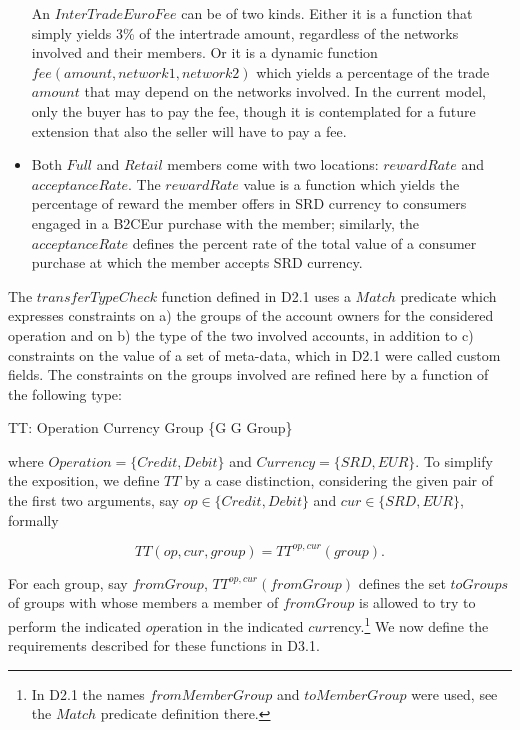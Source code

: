 \begin{itemize}
An $InterTradeEuroFee$ can be of two kinds. Either it is a function that simply yields 3\% of the intertrade amount, regardless of the networks involved and their members. Or it is a dynamic function $fee(amount,network1,network2)$ which yields a percentage of the trade $amount$ that may depend on the networks involved. In the current model, only the buyer has to pay the fee, though it is contemplated for a future extension that also the seller will have to pay a fee.

\item Both $Full$ and $Retail$ members come with two locations: $rewardRate$ and $acceptanceRate$. The $rewardRate$ value is a function which yields the percentage of reward the member offers in SRD currency to consumers engaged in a B2CEur purchase with the member; similarly, the $acceptanceRate$ defines the percent rate of the total value of a consumer purchase at which the member accepts SRD currency.

\end{itemize}

The $transferTypeCheck$ function defined in D2.1 uses a $Match$ predicate which expresses constraints on a) the groups of the account owners for the considered operation and on b) the type of the two involved accounts, in addition to c) constraints on the value of a set of meta-data, which in D2.1 were called custom fields. The constraints on the groups involved are refined here by a function of the following type:
\begin{asm}
TT: Operation \times Currency \times Group \rightarrow \{G \mid G \subseteq Group\}
\end{asm} 
\noindent where $Operation = \{Credit,Debit\}$ and $Currency =\{SRD,EUR\}$.
To simplify the exposition, we define $TT$ by a case distinction, considering the given pair of the first two arguments, say  $op \in \{Credit,Debit\}$ and $cur \in \{SRD,EUR\}$, formally

\[TT(op,cur,group)=TT^{op,cur}(group).\]   

For each group, say $fromGroup$,  $TT^{op,cur}(fromGroup)$ defines the set $toGroups$ of groups with whose members a member of $fromGroup$ is allowed to try to perform the indicated $op$eration in the indicated $cur$rency.\footnote{In D2.1 the names $fromMemberGroup$ and $toMemberGroup$ were used, see the $Match$ predicate definition there.} We now define the requirements described for these functions in D3.1.


